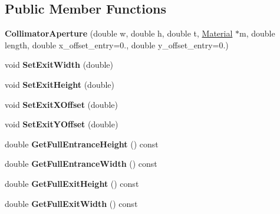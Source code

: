 \subsection*{Public Member Functions}
\begin{DoxyCompactItemize}
\item 
\mbox{\label{classCollimatorAperture_adad8412cd5d214300ff9affba85fd2c0}} 
{\bfseries Collimator\+Aperture} (double w, double h, double t, \hyperlink{classMaterial}{Material} $\ast$m, double length, double x\+\_\+offset\+\_\+entry=0., double y\+\_\+offset\+\_\+entry=0.)
\item 
\mbox{\label{classCollimatorAperture_adbb882e5fd5020f445d9434af14c9976}} 
void {\bfseries Set\+Exit\+Width} (double)
\item 
\mbox{\label{classCollimatorAperture_a033019c071c3237758a12426b2271d7c}} 
void {\bfseries Set\+Exit\+Height} (double)
\item 
\mbox{\label{classCollimatorAperture_a20dc185884657c57576a4429ae252883}} 
void {\bfseries Set\+Exit\+X\+Offset} (double)
\item 
\mbox{\label{classCollimatorAperture_ae36decdc5cf5f485cb49dd2f06560e17}} 
void {\bfseries Set\+Exit\+Y\+Offset} (double)
\item 
\mbox{\label{classCollimatorAperture_afad39797ce9f9b9c2509240cc24b32aa}} 
double {\bfseries Get\+Full\+Entrance\+Height} () const
\item 
\mbox{\label{classCollimatorAperture_abb63b6012de92cd33c33cd7b3646830d}} 
double {\bfseries Get\+Full\+Entrance\+Width} () const
\item 
\mbox{\label{classCollimatorAperture_a3950274bb3219c7a2ac0498446bf6be9}} 
double {\bfseries Get\+Full\+Exit\+Height} () const
\item 
\mbox{\label{classCollimatorAperture_a8f0b1847c4fd67a80a638b3b7c052165}} 
double {\bfseries Get\+Full\+Exit\+Width} () const
\item 

\end{DoxyCompactItemize}
